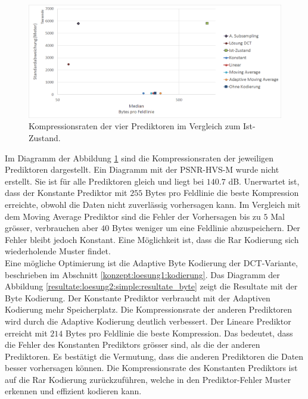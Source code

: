 \begin{figure}[!htbp]
	\center
	\includegraphics[width=1\textwidth,keepaspectratio]{./pictures/resultate/loesung2/variante0/resultate.png}
	\caption{Kompressionsraten der vier Prediktoren im Vergleich zum Ist-Zustand.}
	\label{resultate:loesung2:simple:resultate}
\end{figure}
Im Diagramm der Abbildung \ref{resultate:loesung2:simple:resultate} sind die Kompressionsraten der jeweiligen Prediktoren dargestellt. Ein Diagramm mit der PSNR-HVS-M wurde nicht erstellt. Sie ist für alle Prediktoren gleich und liegt bei $140.7$ dB. Unerwartet ist, dass der Konstante Prediktor mit $255$ Bytes pro Feldlinie die beste Kompression erreichte, obwohl die Daten nicht zuverlässig vorhersagen kann. Im Vergleich mit dem Moving Average Prediktor sind die Fehler der Vorhersagen 
bis zu $5$ Mal grösser, verbrauchen aber $40$ Bytes weniger um eine Feldlinie abzuspeichern. Der Fehler bleibt jedoch Konstant. Eine Möglichkeit ist, dass die Rar Kodierung sich wiederholende Muster findet.\\
Eine mögliche Optimierung ist die Adaptive Byte Kodierung der DCT-Variante, beschrieben im Abschnitt \ref{konzept:loesung1:kodierung}. Das Diagramm der Abbildung \ref{resultate:loesung2:simple:resultate_byte} zeigt die Resultate mit der Byte Kodierung. Der Konstante Prediktor verbraucht mit der Adaptiven Kodierung mehr Speicherplatz. Die Kompressionsrate der anderen Prediktoren wird durch die Adaptive Kodierung deutlich verbessert. Der Lineare Prediktor erreicht mit $214$ Bytes pro Feldlinie die beste Kompression. Das bedeutet, dass die Fehler des Konstanten Prediktors grösser sind, als die der anderen Prediktoren. Es bestätigt die Vermutung, dass die anderen Prediktoren die Daten besser vorhersagen können. Die Kompressionsrate des Konstanten Prediktors ist auf die Rar Kodierung zurückzuführen, welche in den Prediktor-Fehler Muster erkennen und effizient kodieren kann.\\ 
